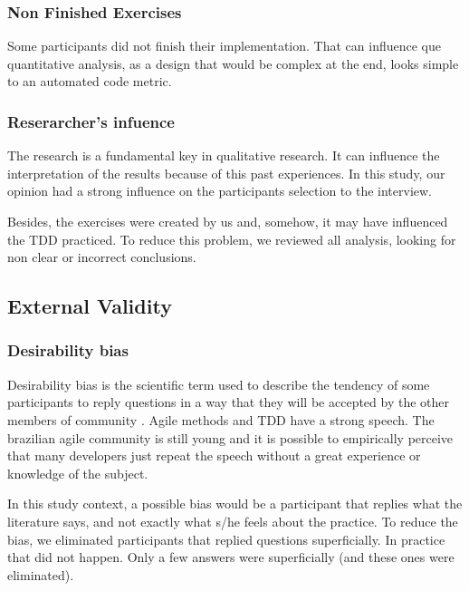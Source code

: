 \documentclass[conference]{IEEEtran}
\begin{document}
\subsubsection{Non Finished Exercises}

Some participants did not finish their implementation. That can influence que
quantitative analysis, as a design that would be complex at the end, looks simple
to an automated code metric.

\subsubsection{Reserarcher's infuence}

The research is a fundamental key in qualitative research. It can influence
the interpretation of the results because of this past experiences.
In this study, our opinion had a strong influence on the participants selection
to the interview.

Besides, the exercises were created by us and, somehow, it may have influenced
the TDD practiced. To reduce this problem, we reviewed all analysis, looking for
non clear or incorrect conclusions.


\subsection{External Validity}

\subsubsection{Desirability bias}

Desirability bias is the scientific term used to describe the tendency of some participants
to reply questions in a way that they will be accepted by the other members
of community \cite{crowne}.
Agile methods and TDD have a strong speech. The brazilian agile community is still
young and it is possible to empirically perceive that many developers just
repeat the speech without a great experience or knowledge of the subject.

In this study context, a possible bias would be a participant that replies
what the literature says, and not exactly what s/he feels about the practice.
To reduce the bias, we eliminated participants that replied questions superficially.
In practice that did not happen. Only a few answers were superficially (and these
ones were eliminated).
\end{document}
